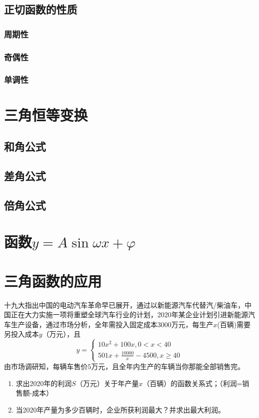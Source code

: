 \begin{conclusion}
\subsection{正切函数的性质}
\subsubsection{周期性}
\subsubsection{奇偶性}
\subsubsection{单调性}

\section{三角恒等变换}
\subsection{和角公式}
\subsection{差角公式}
\subsection{倍角公式}

\section{函数$y=A\sin{\omega x + \varphi}$}


\section{三角函数的应用}

\newpage
\begin{problemset}
\item 十九大指出中国的电动汽车革命早已展开，通过以新能源汽车代替汽/柴油车，中国正在大力实施一项将重塑全球汽车行业的计划，2020年某企业计划引进新能源汽车生产设备，通过市场分析，全年需投入固定成本3000万元，每生产$x$(百辆)需要另投入成本$y$（万元），且
\begin{equation*}
y = \left \{
	\begin{array}{l}
		10x^2+100x, 0 < x <40\\
		\displaystyle 501x + \frac{10000}{x}-4500, x \geq 40
  \end{array}
  \right .
\end{equation*}
由市场调研知，每辆车售价$5$万元，且全年内生产的车辆当你那能全部销售完。
\begin{enumerate}
	\item 求出2020年的利润$S$（万元）关于年产量$x$（百辆）的函数关系式；（利润=销售额-成本）
	\item 当2020年产量为多少百辆时，企业所获利润最大？并求出最大利润。
\end{enumerate}


\end{problemset}
\end{conclusion}
